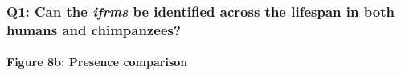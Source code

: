 \documentclass[
]{article}
\begin{document}
\hypertarget{q1-can-the-ifrms-be-identified-across-the-lifespan-in-both-humans-and-chimpanzees}{%
\subsubsection{\texorpdfstring{Q1: Can the \emph{ifrms} be identified
across the lifespan in both humans and
chimpanzees?}{Q1: Can the ifrms be identified across the lifespan in both humans and chimpanzees?}}\label{q1-can-the-ifrms-be-identified-across-the-lifespan-in-both-humans-and-chimpanzees}}

\hypertarget{figure-8b-presence-comparison}{%
\paragraph{Figure 8b: Presence
comparison}\label{figure-8b-presence-comparison}}
\end{document}
